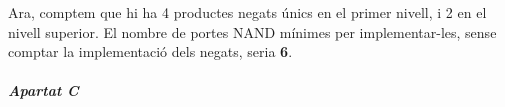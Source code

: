 \documentclass[catalan,border=15pt,class=scrartcl,multi=minipage]{standalone}
\begin{document}
\begin{minipage}{30em}
Ara, comptem que hi ha 4 productes negats únics en el primer nivell, i 2 en el nivell superior. El nombre de portes \textsf{NAND} mínimes per implementar-les, sense comptar la implementació dels negats, seria \textbf{6}.


\subparagraph{Apartat C}



\end{minipage}
\end{document}
